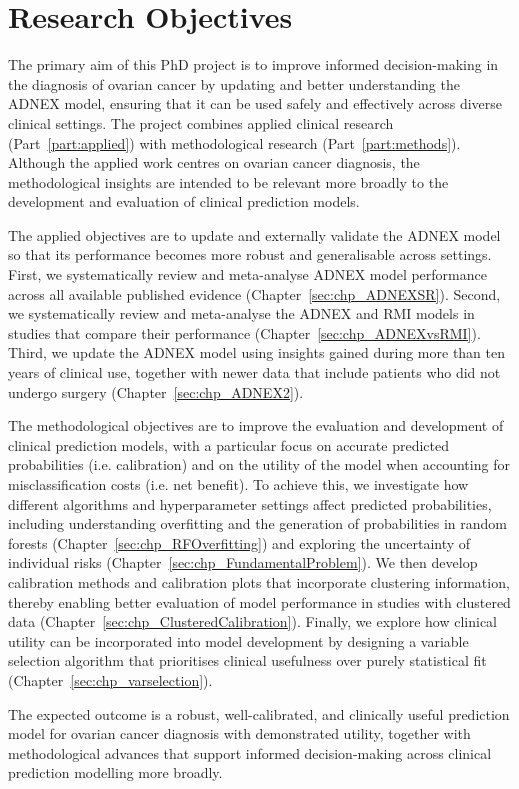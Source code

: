 \chapter{Research Objectives}
\label{sec:research_objectives}

The primary aim of this PhD project is to improve informed decision-making in the diagnosis of ovarian cancer by updating and better understanding the \gls{ADNEX} model, ensuring that it can be used safely and effectively across diverse clinical settings. The project combines applied clinical research (Part~\ref{part:applied}) with methodological research (Part~\ref{part:methods}). Although the applied work centres on ovarian cancer diagnosis, the methodological insights are intended to be relevant more broadly to the development and evaluation of clinical prediction models.

The applied objectives are to update and externally validate the \gls{ADNEX} model so that its performance becomes more robust and generalisable across settings. First, we systematically review and meta-analyse \gls{ADNEX} model performance across all available published evidence (Chapter~\ref{sec:chp_ADNEXSR}). Second, we systematically review and meta-analyse the \gls{ADNEX} and \gls{RMI} models in studies that compare their performance (Chapter~\ref{sec:chp_ADNEXvsRMI}). Third, we update the \gls{ADNEX} model using insights gained during more than ten years of clinical use, together with newer data that include patients who did not undergo surgery (Chapter~\ref{sec:chp_ADNEX2}).

The methodological objectives are to improve the evaluation and development of clinical prediction models, with a particular focus on accurate predicted probabilities (i.e. calibration) and on the utility of the model when accounting for misclassification costs (i.e. net benefit). To achieve this, we investigate how different algorithms and hyperparameter settings affect predicted probabilities, including understanding overfitting and the generation of probabilities in random forests (Chapter~\ref{sec:chp_RFOverfitting}) and exploring the uncertainty of individual risks (Chapter~\ref{sec:chp_FundamentalProblem}). We then develop calibration methods and calibration plots that incorporate clustering information, thereby enabling better evaluation of model performance in studies with clustered data (Chapter~\ref{sec:chp_ClusteredCalibration}). Finally, we explore how clinical utility can be incorporated into model development by designing a variable selection algorithm that prioritises clinical usefulness over purely statistical fit (Chapter~\ref{sec:chp_varselection}).

The expected outcome is a robust, well-calibrated, and clinically useful prediction model for ovarian cancer diagnosis with demonstrated utility, together with methodological advances that support informed decision-making across clinical prediction modelling more broadly.

